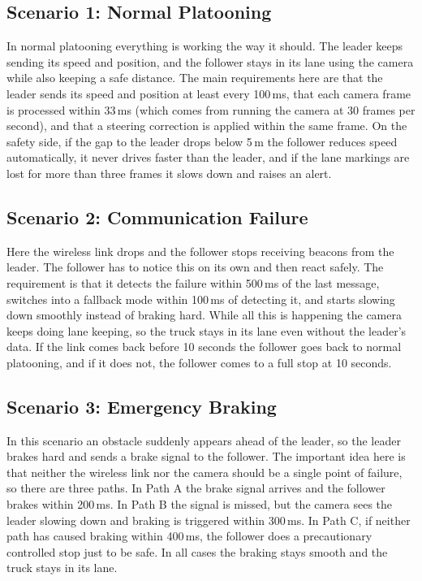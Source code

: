 \documentclass[english]{lni}
\begin{document}
\subsection{Scenario 1: Normal Platooning}
In normal platooning everything is working the way it should. The leader keeps sending its speed and position, and the follower stays in its lane using the camera while also keeping a safe distance. The main requirements here are that the leader sends its speed and position at least every 100\,ms, that each camera frame is processed within 33\,ms (which comes from running the camera at 30 frames per second), and that a steering correction is applied within the same frame. On the safety side, if the gap to the leader drops below 5\,m the follower reduces speed automatically, it never drives faster than the leader, and if the lane markings are lost for more than three frames it slows down and raises an alert.

\subsection{Scenario 2: Communication Failure}
Here the wireless link drops and the follower stops receiving beacons from the leader. The follower has to notice this on its own and then react safely. The requirement is that it detects the failure within 500\,ms of the last message, switches into a fallback mode within 100\,ms of detecting it, and starts slowing down smoothly instead of braking hard. While all this is happening the camera keeps doing lane keeping, so the truck stays in its lane even without the leader's data. If the link comes back before 10 seconds the follower goes back to normal platooning, and if it does not, the follower comes to a full stop at 10 seconds.

\subsection{Scenario 3: Emergency Braking}
In this scenario an obstacle suddenly appears ahead of the leader, so the leader brakes hard and sends a brake signal to the follower. The important idea here is that neither the wireless link nor the camera should be a single point of failure, so there are three paths. In Path A the brake signal arrives and the follower brakes within 200\,ms. In Path B the signal is missed, but the camera sees the leader slowing down and braking is triggered within 300\,ms. In Path C, if neither path has caused braking within 400\,ms, the follower does a precautionary controlled stop just to be safe. In all cases the braking stays smooth and the truck stays in its lane.
\end{document}
